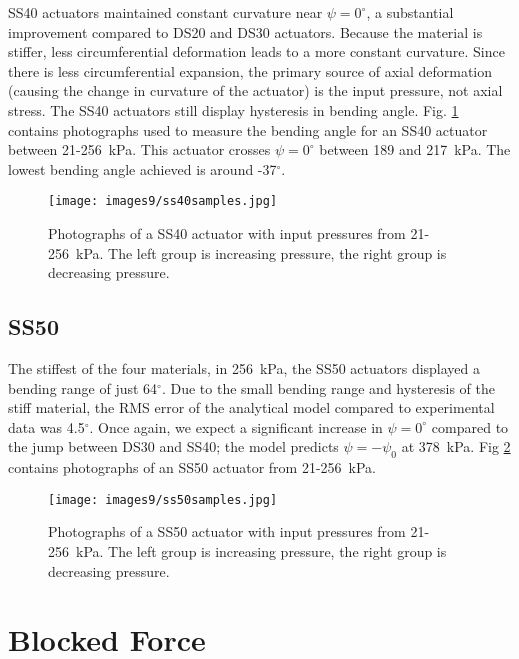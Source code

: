 SS40 actuators maintained constant curvature near $\psi=0^\circ$, a substantial improvement compared to DS20 and DS30 actuators. Because the material is stiffer, less circumferential deformation leads to a more constant curvature. Since there is less circumferential expansion, the primary source of axial deformation (causing the change in curvature of the actuator) is the input pressure, not axial stress. The SS40 actuators still display hysteresis in bending angle. Fig. \ref{fig:ss40samples} contains photographs used to measure the bending angle for an SS40 actuator between 21-256~kPa. This actuator crosses $\psi=0^\circ$ between 189 and 217~kPa. The lowest bending angle achieved is around -37$^\circ$. 
\\
\begin{figure}[ht]
    \centering
     \texttt{[image: images9/ss40samples.jpg]}
    \caption{Photographs of a SS40 actuator with input pressures from 21-256~kPa. The left group is increasing pressure, the right group is decreasing pressure.}
    \label{fig:ss40samples}
\end{figure}

\clearpage
\subsection{SS50}

The stiffest of the four materials, in 256~kPa, the SS50 actuators displayed a bending range of just 64$^\circ$. Due to the small bending range and hysteresis of the stiff material, the RMS error of the analytical model compared to experimental data was 4.5$^\circ$. Once again, we expect a significant increase in $\psi=0^\circ$ compared to the jump between DS30 and SS40; the model predicts $\psi=-\psi_0$ at 378~kPa. Fig \ref{fig:ss50samples} contains photographs of an SS50 actuator from 21-256~kPa. 
\\
\begin{figure}[ht]
    \centering
     \texttt{[image: images9/ss50samples.jpg]}
    \caption{Photographs of a SS50 actuator with input pressures from 21-256~kPa. The left group is increasing pressure, the right group is decreasing pressure.}
    \label{fig:ss50samples}
\end{figure}

\section{Blocked Force}

